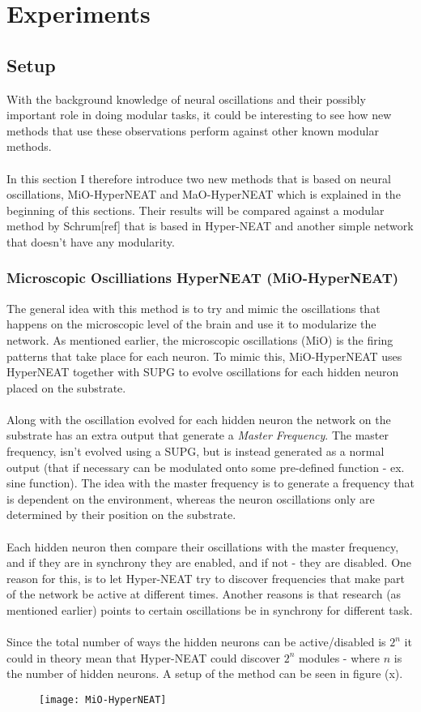 \documentclass[11pt, a4paper]{article}
\begin{document}
\author{Mads Anthony}
\section{Experiments}
\subsection{Setup}
With the background knowledge of neural oscillations and their possibly important role in doing modular tasks, it could be interesting to see how new methods that use these observations perform against other known modular methods.
\\
\\
In this section I therefore introduce two new methods that is based on neural oscillations, MiO-HyperNEAT and MaO-HyperNEAT which is explained in the beginning of this sections. Their results will be compared against a modular method by Schrum[ref] that is based in Hyper-NEAT and another simple network that doesn't have any modularity.
\subsubsection{Microscopic Oscilliations HyperNEAT (MiO-HyperNEAT)}
The general idea with this method is to try and mimic the oscillations that happens on the microscopic level of the brain and use it to modularize the network. As mentioned earlier, the microscopic oscillations (MiO) is the firing patterns that take place for each neuron. To mimic this, MiO-HyperNEAT uses HyperNEAT together with SUPG to evolve oscillations for each hidden neuron placed on the substrate.
\\
\\
Along with the oscillation evolved for each hidden neuron the network on the substrate has an extra output that generate a \textit{Master Frequency}. The master frequency, isn't evolved using a SUPG, but is instead generated as a normal output (that if necessary can be modulated onto some pre-defined function - ex. sine function). The idea with the master frequency is to generate a frequency that is dependent on the environment, whereas the neuron oscillations only are determined by their position on the substrate.
\\
\\
Each hidden neuron then compare their oscillations with the master frequency, and if they are in synchrony they are enabled, and if not - they are disabled. One reason for this, is to let Hyper-NEAT try to discover frequencies that make part of the network be active at different times. Another reasons is that research (as mentioned earlier) points to certain oscillations be in synchrony for different task.
\\
\\
Since the total number of ways the hidden neurons can be active/disabled is $ 2^n $ it could in theory mean that Hyper-NEAT could discover $ 2^n $ modules - where $ n $ is the number of hidden neurons. A setup of the method can be seen in figure (x).
\begin{figure}[!ht]
\centering
\texttt{[image: MiO-HyperNEAT]}
\caption{}
\end{figure}
\\
\end{document}
